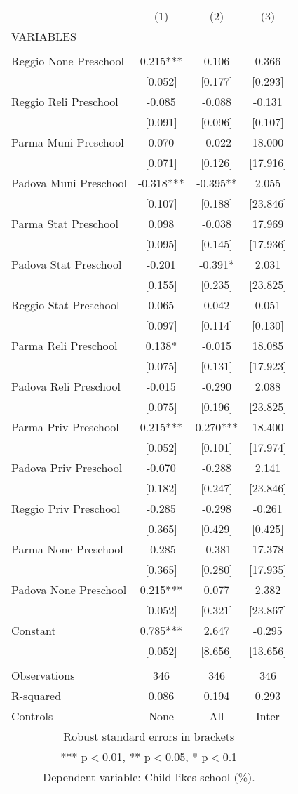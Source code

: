 \begin{tabular}{lccc} \hline
 & (1) & (2) & (3) \\
VARIABLES &  &  &  \\ \hline
 &  &  &  \\
Reggio None Preschool & 0.215*** & 0.106 & 0.366 \\
 & [0.052] & [0.177] & [0.293] \\
Reggio Reli Preschool & -0.085 & -0.088 & -0.131 \\
 & [0.091] & [0.096] & [0.107] \\
Parma Muni Preschool & 0.070 & -0.022 & 18.000 \\
 & [0.071] & [0.126] & [17.916] \\
Padova Muni Preschool & -0.318*** & -0.395** & 2.055 \\
 & [0.107] & [0.188] & [23.846] \\
Parma Stat Preschool & 0.098 & -0.038 & 17.969 \\
 & [0.095] & [0.145] & [17.936] \\
Padova Stat Preschool & -0.201 & -0.391* & 2.031 \\
 & [0.155] & [0.235] & [23.825] \\
Reggio Stat Preschool & 0.065 & 0.042 & 0.051 \\
 & [0.097] & [0.114] & [0.130] \\
Parma Reli Preschool & 0.138* & -0.015 & 18.085 \\
 & [0.075] & [0.131] & [17.923] \\
Padova Reli Preschool & -0.015 & -0.290 & 2.088 \\
 & [0.075] & [0.196] & [23.825] \\
Parma Priv Preschool & 0.215*** & 0.270*** & 18.400 \\
 & [0.052] & [0.101] & [17.974] \\
Padova Priv Preschool & -0.070 & -0.288 & 2.141 \\
 & [0.182] & [0.247] & [23.846] \\
Reggio Priv Preschool & -0.285 & -0.298 & -0.261 \\
 & [0.365] & [0.429] & [0.425] \\
Parma None Preschool & -0.285 & -0.381 & 17.378 \\
 & [0.365] & [0.280] & [17.935] \\
Padova None Preschool & 0.215*** & 0.077 & 2.382 \\
 & [0.052] & [0.321] & [23.867] \\
Constant & 0.785*** & 2.647 & -0.295 \\
 & [0.052] & [8.656] & [13.656] \\
 &  &  &  \\
Observations & 346 & 346 & 346 \\
R-squared & 0.086 & 0.194 & 0.293 \\
 Controls & None & All & Inter \\ \hline
\multicolumn{4}{c}{ Robust standard errors in brackets} \\
\multicolumn{4}{c}{ *** p$<$0.01, ** p$<$0.05, * p$<$0.1} \\
\multicolumn{4}{c}{ Dependent variable: Child likes school (\%).} \\
\end{tabular}
